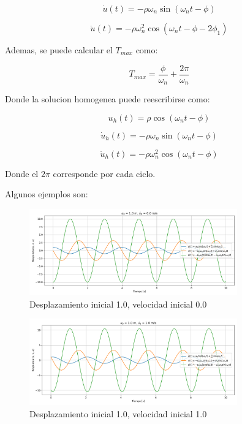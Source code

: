\documentclass{article}  %
\begin{document}
\begin{equation}
    \dot{u}(t) = -\rho \omega_n \sin(\omega_n t - \phi)
\end{equation}

\begin{equation}
    \ddot{u}(t) = -\rho \omega_n^2 \cos(\omega_n t - \phi - 2\phi_1)
\end{equation}

Ademas, se puede calcular el $T_{max}$ como:

\begin{equation}
    T_{max} = \frac{\phi}{\omega_n} + \frac{2\pi}{\omega_n} 
\end{equation}

Donde la solucion homogenea puede reescribirse como:

\begin{equation}
    u_h(t) = \rho \cos(\omega_n t - \phi) 
\end{equation}

\begin{equation}
    \dot{u}_h(t) = -\rho \omega_n \sin(\omega_n t - \phi)
\end{equation}

\begin{equation}
    \ddot{u}_h(t) = -\rho \omega_n^2 \cos(\omega_n t - \phi)
\end{equation}

Donde el $2\pi$ corresponde por cada ciclo.

Algunos ejemplos son:

\begin{figure}[H]
    \centering
    \includegraphics[width=0.8\textwidth]{GRAFICOS/sis_no_amortiguado_u0_1.0_v0_0.0.png}
    \caption{Desplazamiento inicial 1.0, velocidad inicial 0.0}
    \label{fig:ejemplo1}
\end{figure}

\begin{figure}[H]
    \centering
    \includegraphics[width=0.8\textwidth]{GRAFICOS/sis_no_amortiguado_u0_1.0_v0_1.0.png}
    \caption{Desplazamiento inicial 1.0, velocidad inicial 1.0}
    \label{fig:ejemplo1}
\end{figure}
\end{document}
